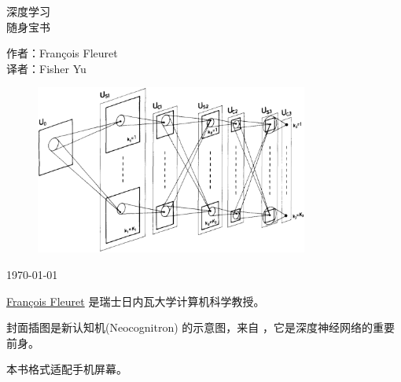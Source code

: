 \documentclass[oneside,11pt]{memoir}
\begin{document}
\thispagestyle{empty}

\begin{center}


{\huge 深度学习\\[0.75ex] 随身宝书}

\vspace*{4ex}

作者：François Fleuret \\
译者：Fisher Yu


\begin{figure}[!htbp]
\centering
\includegraphics[width=0.8\textwidth]{cover.png}
\end{figure}


\footnotesize \dotdate\today

\end{center}

\newpage



\href{https://fleuret.org/francois/}{François Fleuret} 是瑞士日内瓦大学计算机科学教授。

封面插图是新认知机(Neocognitron) 的示意图，来自 \cite{Fukushima1980}，它是深度神经网络的重要前身。

本书格式适配手机屏幕。


\vspace*{-3ex}
\end{document}

